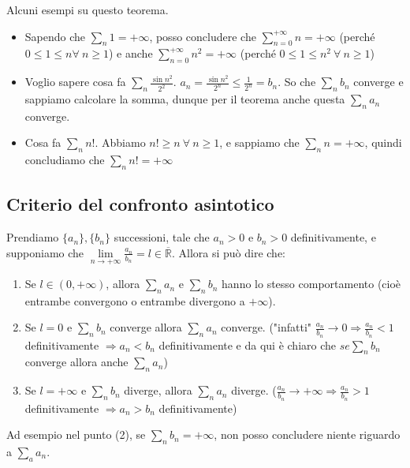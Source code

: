 \begin{example}
Alcuni esempi su questo teorema.
\begin{itemize}
    \item Sapendo che $\sum_n 1 = +\infty$, posso concludere che $\sum_{n=0}^{+\infty}n = +\infty$ (perché $0 \leq 1 \leq n \forall \: n \geq 1$) e anche $\sum_{n=0}^{+\infty}n^2 = +\infty$ (perché $0 \leq 1 \leq n^2 \: \forall \:n \geq 1$)
    \item Voglio sapere cosa fa $\sum_n \frac{\sin{n}^2}{2^2}$. $a_n = \frac{\sin{n}^2}{2^n} \leq \frac{1}{2^n} = b_n$. So che $\sum_n b_n$ converge e sappiamo calcolare la somma, dunque per il teorema anche questa $\sum_n a_n$ converge.
    \item Cosa fa $\sum_n n!$. Abbiamo $n! \geq n \: \forall \:n \geq 1$, e sappiamo che $\sum_n n = +\infty$, quindi concludiamo che $\sum_n n! = +\infty$
\end{itemize}
\end{example}

\subsection{Criterio del confronto asintotico}
\begin{theorem}
Prendiamo $\{a_n\}, \{b_n\}$ successioni, tale che $a_n > 0$ e $b_n > 0$ definitivamente, e supponiamo che $\lim\limits_{n\to +\infty}\frac{a_n}{b_n}= l \in \overline{\mathbb{R}}$. Allora si può dire che:
\begin{enumerate}
    \item Se $l \in (0, +\infty)$, allora $\sum_n a_n$ e $\sum_n b_n$ hanno lo stesso comportamento (cioè entrambe convergono o entrambe divergono a $+\infty$).
    \item Se $l = 0$ e $\sum_n b_n$ converge allora $\sum_n a_n$ converge. ("infatti" $\frac{a_n}{b_n}\to 0 \Longrightarrow \frac{a_n}{b_n} <1$ definitivamente $\Longrightarrow a_n < b_n$ definitivamente e da qui è chiaro che $se \sum_n b_n$ converge allora anche $\sum_n a_n$)
    \item Se $l = +\infty$ e $\sum_n b_n$ diverge, allora $\sum_n a_n$ diverge. ($\frac{a_n}{b_n}\to +\infty \Longrightarrow \frac{a_n}{b_n} > 1$ definitivamente $\Longrightarrow a_n > b_n$ definitivamente)
\end{enumerate}
\end{theorem}

\begin{observation}
Ad esempio nel punto (2), se $\sum_n b_n = +\infty$, non posso concludere niente riguardo a $\sum_a a_n$.
\end{observation}

